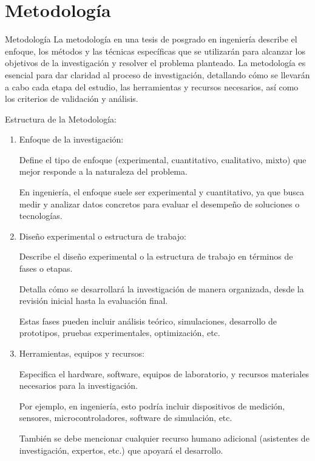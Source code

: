 \documentclass[9pt]{beamer}
\begin{document}
\section{Metodología}
\begin{frame}{Metodología}
La metodología en una tesis de posgrado en ingeniería describe el enfoque, los métodos y las técnicas específicas que se utilizarán para alcanzar los objetivos de la investigación y resolver el problema planteado. La metodología es esencial para dar claridad al proceso de investigación, detallando cómo se llevarán a cabo cada etapa del estudio, las herramientas y recursos necesarios, así como los criterios de validación y análisis.

Estructura de la Metodología:

\begin{enumerate}
    \item Enfoque de la investigación:

    Define el tipo de enfoque (experimental, cuantitativo, cualitativo, mixto) que mejor responde a la naturaleza del problema.

    En ingeniería, el enfoque suele ser experimental y cuantitativo, ya que busca medir y analizar datos concretos para evaluar el desempeño de soluciones o tecnologías.

    \item Diseño experimental o estructura de trabajo:

    Describe el diseño experimental o la estructura de trabajo en términos de fases o etapas.

    Detalla cómo se desarrollará la investigación de manera organizada, desde la revisión inicial hasta la evaluación final.

    Estas fases pueden incluir análisis teórico, simulaciones, desarrollo de prototipos, pruebas experimentales, optimización, etc.

    \item Herramientas, equipos y recursos:

    Especifica el hardware, software, equipos de laboratorio, y recursos materiales necesarios para la investigación.

    Por ejemplo, en ingeniería, esto podría incluir dispositivos de medición, sensores, microcontroladores, software de simulación, etc.

    También se debe mencionar cualquier recurso humano adicional (asistentes de investigación, expertos, etc.) que apoyará el desarrollo.


\end{enumerate}
\end{frame}
\end{document}

